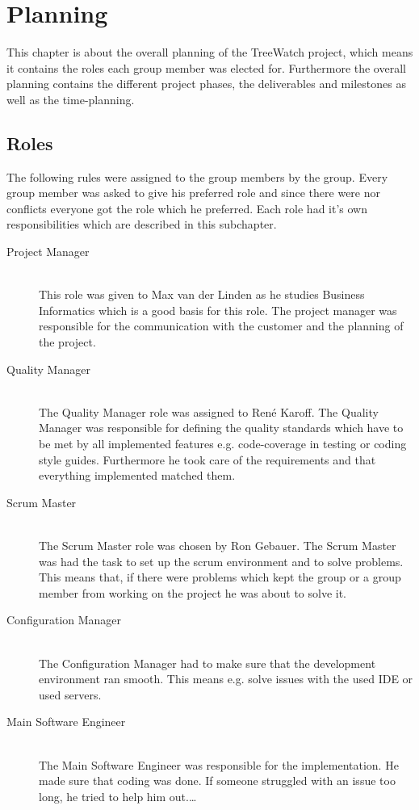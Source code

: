 \section{Planning}
This chapter is about the overall planning of the TreeWatch project, which means it contains the roles each group member was elected for. Furthermore the overall planning contains the different project phases, the deliverables and milestones as well as the time-planning.
\subsection{Roles}
The following rules were assigned to the group members by the group. Every group member was asked to give his preferred role and since there were nor conflicts everyone got the role which he preferred. Each role had it's own responsibilities which are described in this subchapter.
\begin{description}
	\item[Project Manager] \hfill \\
	This role was given to Max van der Linden as he studies Business Informatics which is a good basis for this role. The project manager was responsible for the communication with the customer and the planning of the project.
	\item[Quality Manager] \hfill \\
	The Quality Manager  role was assigned to René Karoff. The Quality Manager was responsible for defining the quality standards which have to be met by all implemented features e.g. code-coverage in testing or coding style guides. Furthermore he took care of the requirements and that everything implemented matched them.
	\item[Scrum Master] \hfill \\
	The Scrum Master role was chosen by Ron Gebauer. The Scrum Master was had the task to set up the scrum environment and to solve problems. This means that, if there were problems which kept the group or a group member from working on the project he was about to solve it.
	\item[Configuration Manager] \hfill \\
	The Configuration Manager had to make sure that the development environment ran smooth. This means e.g. solve issues with the used IDE or used servers.
	\item[Main Software Engineer] \hfill \\
	The Main Software Engineer was responsible for the implementation. He made sure that coding was done. If someone struggled with an issue too long, he tried to help him out.\ldots
\end{description}

